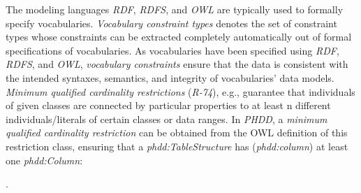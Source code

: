 \documentclass{llncs}
\newcommand{\ms}[1]{\texttt{#1}}
\begin{document}
The modeling languages \emph{RDF}, \emph{RDFS}, and \emph{OWL} are typically used to formally specify vocabularies.
\emph{Vocabulary constraint types}
denotes the set of constraint types whose constraints 
can be extracted completely automatically out of formal specifications of vocabularies.
As vocabularies have been specified using \emph{RDF}, \emph{RDFS}, and \emph{OWL},
\emph{vocabulary constraints} ensure that the data is consistent with the intended syntaxes, semantics, and integrity of vocabularies' data models.
\emph{Minimum qualified cardinality restrictions} (\emph{R-74}), e.g., guarantee that individuals of given classes are connected by particular properties to at least n different individuals/literals of certain classes or data ranges.
In \emph{PHDD}, a \emph{minimum qualified cardinality restriction} can be obtained from the OWL definition of this restriction class, ensuring that a \emph{phdd:TableStructure} has (\emph{phdd:column}) at least one \emph{phdd:Column}:
\begin{ex}
 .
\end{ex}
\end{document}
